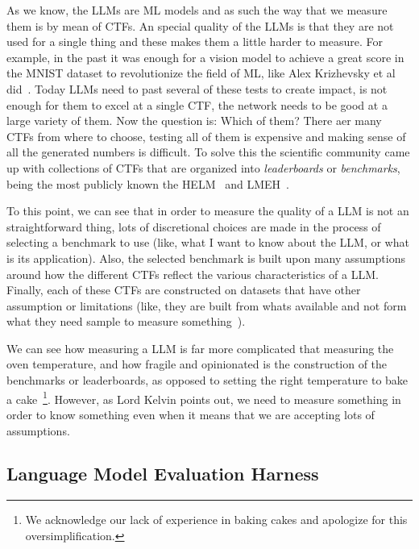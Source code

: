 As we know, the \gls{LLM}s are \gls{ML} models and as such the way that we measure them is by mean of \gls{CTF}s. An special quality of the \gls{LLM}s is that they are not used for a single thing and these makes them a little harder to measure. For example, in the past it was enough for a vision model to achieve a great score in the MNIST dataset to revolutionize the field of \gls{ML}, like Alex Krizhevsky et al did~\cite{krizhevsky2012imagenet}. Today \gls{LLM}s need to past several of these tests to create impact, is not enough for them to excel at a single \gls{CTF}, the network needs to be good at a large variety of them. Now the question is: Which of them? There aer many \gls{CTF}s from where to choose, testing all of them is expensive and making sense of all the generated numbers is difficult. To solve this the scientific community came up with collections of \gls{CTF}s that are organized into \emph{leaderboards} or \emph{benchmarks}, being the most publicly known the \gls{HELM}~\cite{liang_holistic_2023} and \gls{LMEH}~\cite{eval-harness}. 

To this point, we can see that in order to measure the quality of a \gls{LLM} is not an straightforward thing, lots of discretional choices are made in the process of selecting a benchmark to use (like, what I want to know about the \gls{LLM}, or what is its application). Also, the selected benchmark is built upon many assumptions around how the different \gls{CTF}s reflect the various characteristics of a \gls{LLM}. Finally, each of these \gls{CTF}s are constructed on datasets that have other assumption or limitations (like, they are built from whats available  and not form what they need sample to measure something~\cite{raji2021ai}).

We can see how measuring a \gls{LLM} is far more complicated that measuring the oven temperature, and how fragile and opinionated is the construction of the benchmarks or leaderboards, as opposed to setting the right temperature to bake a cake~\footnote{We acknowledge our lack of experience in baking cakes and apologize for this oversimplification.}. However, as Lord Kelvin points out, we need to measure something in order to know something even when it means that we are accepting lots of assumptions.



\subsection{Language Model Evaluation Harness}

